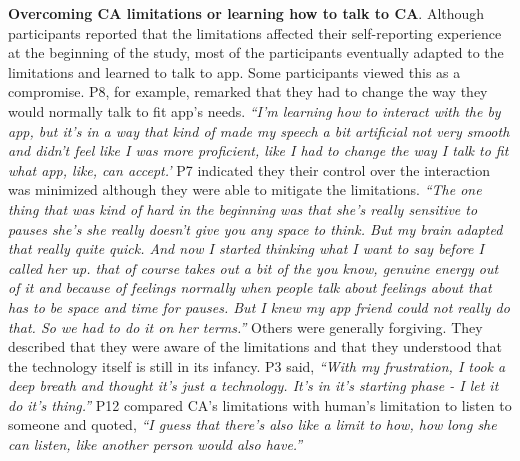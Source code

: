     \textbf{Overcoming \ac{CA} limitations or learning how to talk to \ac{CA}}.
        Although participants reported that the limitations affected their self-reporting experience at the beginning of the study, most of the participants eventually adapted to the limitations and learned to talk to \acl{app}. 
        Some participants viewed this as a compromise.
        P8, for example, remarked that they had to change the way they would normally talk to fit \acl{app}'s needs.
                \textit{``I'm learning how to interact with the by \acl{app}, but it's in a way that kind of made my speech a bit artificial not very smooth and didn't feel like I was more proficient, like I had to change the way I talk to fit what \acl{app}, like, can accept.'}
        P7 indicated they their control over the interaction was minimized although they were able to mitigate the limitations.
                \textit{``The one thing that was kind of hard in the beginning was that she's really sensitive to pauses she's she really doesn't give you any space to think. But my brain adapted that really quite quick. 
                And now I started thinking what I want to say before I called her up. that of course takes out a bit of the you know, genuine energy out of it and because of feelings normally when people talk about feelings about that has to be space and time for pauses. But I knew my \acl{app} friend could not really do that. 
                So we had to do it on her terms.''}
        Others were generally forgiving. They described that they were aware of the limitations and that they understood that the technology itself is still in its infancy. P3 said,
                \textit{
                ``With my frustration, I took a deep breath and thought it’s just a technology. It’s in it’s starting phase - I let it do it’s thing.''
                }
        P12 compared \ac{CA}'s limitations with human's limitation to listen to someone and quoted,
                \textit{
                ``I guess that there's also like a limit to how, how long she can listen, like another person would also have.''
                }

